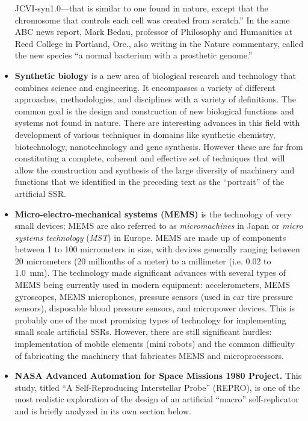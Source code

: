 \begin{itemize}
JCVI-syn1.0---that is similar to one found in nature, except that the
chromosome that controls each cell was created from scratch.”\citep{smith2010}\citep{gibsonetal2010} In the same ABC news report,
Mark Bedau, professor of Philosophy and
Humanities at Reed College in Portland, Ore., also writing in the
Nature commentary, called the new species ``a normal
bacterium with a prosthetic genome.''\citep{smith2010}
\item \textbf{Synthetic biology} is a new area of biological
research and technology that combines science and engineering. It
encompasses a variety of different approaches, methodologies, and
disciplines with a variety of definitions. The common goal is the
design and construction of new biological functions and systems not
found in nature.\citep{heinemann2006} There are interesting advances in this field with
development of various techniques in domains like synthetic chemistry,
biotechnology, nanotechnology and gene synthesis. However these are far
from constituting a complete, coherent and effective set of techniques
that will allow the construction and synthesis of the large diversity
of machinery and functions that we identified in the preceding text as
the “portrait” of the artificial SSR.
\item \textbf{Micro-electro-mechanical systems (MEMS)} is the technology
of very small devices; MEMS are also referred to as
\textit{micromachines} in Japan or \textit{micro systems technology} (\textit{MST}) in Europe. 
MEMS are made up of components between 1 to
100 micrometers in size, with devices generally ranging between 20 micrometers (20 millionths of a meter)
to a millimeter (i.e. 0.02 to 1.0~mm)\citep{lyshevski2000}. The technology made significant
advances with several types of MEMS being currently used in modern
equipment:  accelerometers, MEMS gyroscopes, MEMS microphones, pressure
sensors (used in car tire pressure sensors), disposable blood pressure
sensors, and micropower devices. This is probably one of the most
promising types of technology for implementing small scale artificial
SSRs. However, there are still significant hurdles: implementation of
mobile elements (mini robots) and the common difficulty of fabricating
the machinery that fabricates MEMS and microprocessors.
\item \textbf{NASA Advanced Automation for Space Missions 1980 Project.}
This study, titled ``A Self-Reproducing Interstellar Probe'' (REPRO), 
is one of the most realistic exploration of the design of
an artificial ``macro'' self-replicator and is briefly analyzed in its
own section below.\citep{freitas1980} 
\end{itemize}

